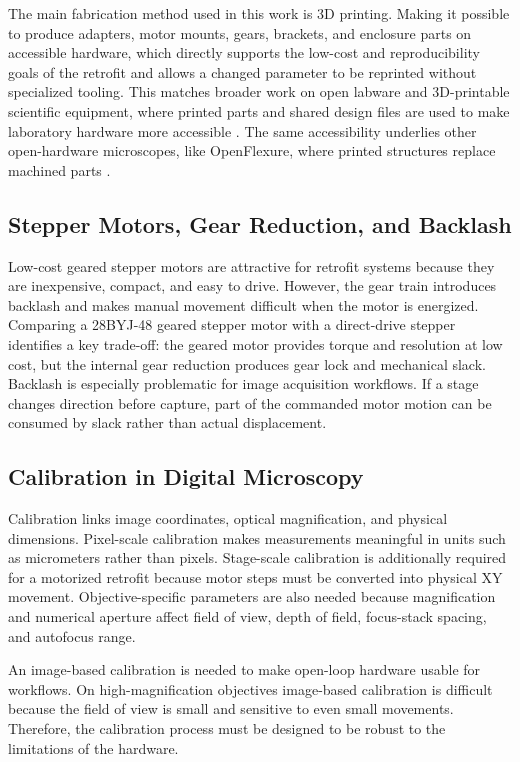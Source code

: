 The main fabrication method used in this work is 3D printing. Making it possible to produce adapters, motor mounts, gears, brackets, and enclosure parts on accessible hardware, which directly supports the low-cost and reproducibility goals of the retrofit and allows a changed parameter to be reprinted without specialized tooling. This matches broader work on open labware and 3D-printable scientific equipment, where printed parts and shared design files are used to make laboratory hardware more accessible \cite{baden2015openlabware,zhang2013opensourceoptics}. The same accessibility underlies other open-hardware microscopes, like OpenFlexure, where printed structures replace machined parts \cite{collins2020openflexure}.

\subsection{Stepper Motors, Gear Reduction, and Backlash}

Low-cost geared stepper motors are attractive for retrofit systems because they are inexpensive, compact, and easy to drive. However, the gear train introduces backlash and makes manual movement difficult when the motor is energized. Comparing a 28BYJ-48 geared stepper motor with a direct-drive stepper identifies a key trade-off: the geared motor provides torque and resolution at low cost, but the internal gear reduction produces gear lock and mechanical slack. Backlash is especially problematic for image acquisition workflows. If a stage changes direction before capture, part of the commanded motor motion can be consumed by slack rather than actual displacement.

\subsection{Calibration in Digital Microscopy}

Calibration links image coordinates, optical magnification, and physical dimensions. Pixel-scale calibration makes measurements meaningful in units such as micrometers rather than pixels. Stage-scale calibration is additionally required for a motorized retrofit because motor steps must be converted into physical XY movement. Objective-specific parameters are also needed because magnification and numerical aperture affect field of view, depth of field, focus-stack spacing, and autofocus range.

An image-based calibration is needed to make open-loop hardware usable for workflows. On high-magnification objectives image-based calibration is difficult because the field of view is small and sensitive to even small movements. Therefore, the calibration process must be designed to be robust to the limitations of the hardware.

